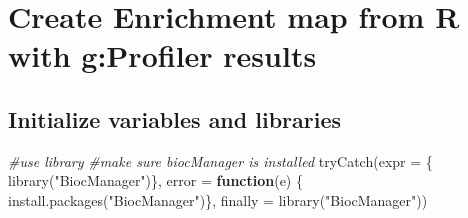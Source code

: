 \documentclass[
]{book}
\newenvironment{Shaded}{\begin{snugshade}}{\end{snugshade}}
\newcommand{\AttributeTok}[1]{\textcolor[rgb]{0.77,0.63,0.00}{#1}}
\newcommand{\CommentTok}[1]{\textcolor[rgb]{0.56,0.35,0.01}{\textit{#1}}}
\newcommand{\ConstantTok}[1]{\textcolor[rgb]{0.00,0.00,0.00}{#1}}
\newcommand{\ControlFlowTok}[1]{\textcolor[rgb]{0.13,0.29,0.53}{\textbf{#1}}}
\newcommand{\DecValTok}[1]{\textcolor[rgb]{0.00,0.00,0.81}{#1}}
\newcommand{\FunctionTok}[1]{\textcolor[rgb]{0.00,0.00,0.00}{#1}}
\newcommand{\NormalTok}[1]{#1}
\newcommand{\OtherTok}[1]{\textcolor[rgb]{0.56,0.35,0.01}{#1}}
\newcommand{\SpecialCharTok}[1]{\textcolor[rgb]{0.00,0.00,0.00}{#1}}
\newcommand{\StringTok}[1]{\textcolor[rgb]{0.31,0.60,0.02}{#1}}
\begin{document}
\begin{Shaded}
\end{Shaded}

\hypertarget{create-enrichment-map-from-r-with-gprofiler-results}{%
\chapter{Create Enrichment map from R with g:Profiler results}\label{create-enrichment-map-from-r-with-gprofiler-results}}

\hypertarget{initialize-variables-and-libraries-1}{%
\section{Initialize variables and libraries}\label{initialize-variables-and-libraries-1}}

\begin{Shaded}
\begin{Highlighting}[]
\CommentTok{\#use library}
\CommentTok{\#make sure biocManager is installed}
\FunctionTok{tryCatch}\NormalTok{(}\AttributeTok{expr =}\NormalTok{ \{ }\FunctionTok{library}\NormalTok{(}\StringTok{"BiocManager"}\NormalTok{)\}, }
         \AttributeTok{error =} \ControlFlowTok{function}\NormalTok{(e) \{ }
           \FunctionTok{install.packages}\NormalTok{(}\StringTok{"BiocManager"}\NormalTok{)\}, }
         \AttributeTok{finally =} \FunctionTok{library}\NormalTok{(}\StringTok{"BiocManager"}\NormalTok{))}
\end{Highlighting}
\end{Shaded}
\end{document}
